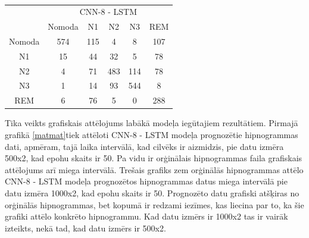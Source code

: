 \documentclass[12pt,paper=A4]{report}
\begin{document}
\begin{table}[H]
\centering
\caption{}
\captionsetup{justification=centering}
\begin{tabular}{cccccc}
\multicolumn{1}{l}{} & \multicolumn{5}{c}{CNN-8 - LSTM} \\ \cline{2-6} 
\multicolumn{1}{l|}{} & \multicolumn{1}{c|}{Nomoda} & \multicolumn{1}{c|}{N1} & \multicolumn{1}{c|}{N2} & \multicolumn{1}{c|}{N3} & \multicolumn{1}{c|}{REM} \\ \hline
\multicolumn{1}{|c|}{Nomoda} & \multicolumn{1}{c|}{\cellcolor[HTML]{FFFFC7}574} & \multicolumn{1}{c|}{115} & \multicolumn{1}{c|}{4} & \multicolumn{1}{c|}{8} & \multicolumn{1}{c|}{107} \\ \hline
\multicolumn{1}{|c|}{N1} & \multicolumn{1}{c|}{15} & \multicolumn{1}{c|}{\cellcolor[HTML]{FFFFC7}44} & \multicolumn{1}{c|}{32} & \multicolumn{1}{c|}{5} & \multicolumn{1}{c|}{78} \\ \hline
\multicolumn{1}{|c|}{N2} & \multicolumn{1}{c|}{4} & \multicolumn{1}{c|}{71} & \multicolumn{1}{c|}{\cellcolor[HTML]{FFFFC7}483} & \multicolumn{1}{c|}{114} & \multicolumn{1}{c|}{78} \\ \hline
\multicolumn{1}{|c|}{N3} & \multicolumn{1}{c|}{1} & \multicolumn{1}{c|}{14} & \multicolumn{1}{c|}{93} & \multicolumn{1}{c|}{\cellcolor[HTML]{FFFFC7}544} & \multicolumn{1}{c|}{8} \\ \hline
\multicolumn{1}{|c|}{REM} & \multicolumn{1}{c|}{6} & \multicolumn{1}{c|}{76} & \multicolumn{1}{c|}{5} & \multicolumn{1}{c|}{0} & \multicolumn{1}{c|}{\cellcolor[HTML]{FFFFC7}288} \\ \hline
\end{tabular}
\label{matrixOfConf1000}
\end{table}

Tika veikts grafiskais attēlojums labākā modeļa iegūtajiem rezultātiem. Pirmajā grafikā \ref{matmat}tiek attēloti CNN-8 - LSTM modeļa prognozētie hipnogrammas dati, apmēram, tajā laika intervālā, kad cilvēks ir aizmidzis, pie datu izmēra 500x2, kad epohu skaits ir 50. Pa vidu ir orģinālais hipnogrammas faila grafiskais attēlojums arī miega intervālā. Trešais grafiks zem orģinālās hipnogrammas attēlo CNN-8 - LSTM modeļa prognozētos hipnogrammas datus miega intervālā pie datu izmēra 1000x2, kad epohu skaits ir 50. Prognozēto datu grafiski atšķiras no orģinālās hipnogrammas, bet kopumā ir redzami iezīmes, kas liecina par to, ka šie grafiki attēlo konkrēto hipnogrammu. Kad datu 
izmērs ir 1000x2 tas ir vairāk izteikts, nekā tad, kad datu izmērs ir 500x2.
\end{document}
